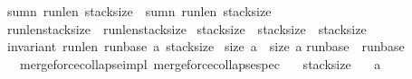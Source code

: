 \begin{isabellebody}
{\isacharparenleft}sumn\ {\isasymacute}run{\isacharunderscore}len\ {\isasymacute}stack{\isacharunderscore}size\ {\isacharequal}\ sumn\ \isactrlbsup {\isasymsigma}\isactrlesup run{\isacharunderscore}len\ \isactrlbsup {\isasymsigma}\isactrlesup stack{\isacharunderscore}size\ {\isacharparenright}\ {\isasymand}\isanewline
{\isacharparenleft}{\isasymacute}run{\isacharunderscore}len{\isacharbang}{\isacharparenleft}{\isasymacute}stack{\isacharunderscore}size{\isacharminus}{}{\isacharparenright}\ {\isasymge}\ \isactrlbsup {\isasymsigma}\isactrlesup run{\isacharunderscore}len{\isacharbang}{\isacharparenleft}\isactrlbsup {\isasymsigma}\isactrlesup stack{\isacharunderscore}size{\isacharminus}{}{\isacharparenright}{\isacharparenright}\ {\isasymand}\isanewline
{\isacharparenleft}{\isasymacute}stack{\isacharunderscore}size{\isachargreater}{}\ {\isasymand}\ {\isasymacute}stack{\isacharunderscore}size\ {\isasymle}\ \isactrlbsup {\isasymsigma}\isactrlesup stack{\isacharunderscore}size{\isacharparenright}\ {\isasymand}\isanewline
{\isacharparenleft}invariant\ {\isasymacute}run{\isacharunderscore}len\ {\isasymacute}run{\isacharunderscore}base\ {\isasymacute}a\ {\isasymacute}stack{\isacharunderscore}size{\isacharparenright}\ {\isasymand}\isanewline
{\isacharparenleft}size\ {\isasymacute}a\ {\isacharequal}\ size\ \isactrlbsup {\isasymsigma}\isactrlesup a{\isacharparenright}{\isasymand}\isanewline
{\isacharparenleft}{\isasymacute}run{\isacharunderscore}base{\isacharbang}{}\ {\isacharequal}\ \isactrlbsup {\isasymsigma}\isactrlesup run{\isacharunderscore}base{\isacharbang}{}{\isacharparenright}\ {\isasymrbrace}{\isachardoublequoteclose}\isanewline
%
\isadelimproof
\ \ %
\endisadelimproof
%
\isatagproof
{}\isamarkupfalse%
%
\endisatagproof
{\isafoldproof}%
%
\isadelimproof
\isanewline
%
\endisadelimproof
\isanewline
\isanewline
\isanewline
{}\isamarkupfalse%
\ {\isacharparenleft}\ merge{\isacharunderscore}force{\isacharunderscore}collapse{\isacharunderscore}impl{\isacharparenright}\ merge{\isacharunderscore}force{\isacharunderscore}collapse{\isacharunderscore}spec{\isacharcolon}\isanewline
{\isachardoublequoteopen}{\isasymforall}{\isasymsigma}{\isachardot}\ {\isasymGamma}{\isasymturnstile}\ {\isasymlbrace}{\isasymsigma}{\isachardot}\ {\isacharparenleft}{\isasymacute}stack{\isacharunderscore}size\ {\isachargreater}\ {}{\isacharparenright}\ {\isasymand}\isanewline
{\isacharparenleft}{\isasymacute}a\ {\isasymnoteq}\ {\isacharbrackleft}{\isacharbrackright}{\isacharparenright}\ {\isasymand}\isanewline

\end{isabellebody}
